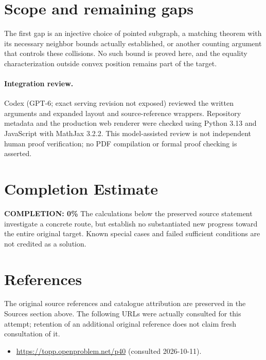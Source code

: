 \documentclass[11pt,a4paper]{article}
\begin{document}
\section{Scope and remaining gaps}
The first gap is an injective choice of pointed subgraph, a matching theorem
with its necessary neighbor bounds actually established, or another counting
argument that controls these collisions. No such bound is proved here, and the
equality characterization outside convex position remains part of the target.
\paragraph{Integration review.} Codex (GPT-6; exact serving revision not exposed) reviewed the written arguments and expanded layout and source-reference wrappers. Repository metadata and the production web renderer were checked using Python 3.13 and JavaScript with MathJax 3.2.2. This model-assisted review is not independent human proof verification; no PDF compilation or formal proof checking is asserted.

\section{Completion Estimate}
\noindent\textbf{COMPLETION: 0\%}
The calculations below the preserved source statement investigate a concrete route,
but establish no substantiated new progress toward the entire original target.
Known special cases and failed sufficient conditions are not credited as a solution.
\section{References}
The original source references and catalogue attribution are preserved in the
Sources section above. The following URLs were actually consulted for this attempt;
retention of an additional original reference does not claim fresh consultation of it.
\begin{itemize}
\item \url{https://topp.openproblem.net/p40} (consulted 2026-10-11). 
\end{itemize}
\end{document}

